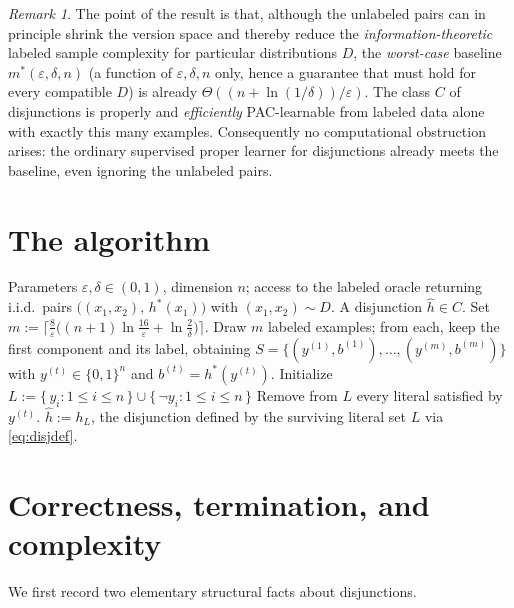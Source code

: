 \documentclass{amsart}
\theoremstyle{definition}
\theoremstyle{remark}
\newtheorem{remark}{Remark}
\newcommand{\eps}{\varepsilon}
\begin{document}
\begin{remark}
The point of the result is that, although the unlabeled pairs can in principle
shrink the version space and thereby reduce the \emph{information-theoretic}
labeled sample complexity for particular distributions $D$, the
\emph{worst-case} baseline $m^*(\eps,\delta,n)$ (a function of $\eps,\delta,n$
only, hence a guarantee that must hold for every compatible $D$) is already
$\Theta((n+\ln(1/\delta))/\eps)$. The class $C$ of disjunctions is properly and
\emph{efficiently} PAC-learnable from labeled data alone with exactly this many
examples. Consequently no computational obstruction arises: the ordinary
supervised proper learner for disjunctions already meets the baseline, even
ignoring the unlabeled pairs.
\end{remark}

\section{The algorithm}

\begin{algorithm}[h]
\caption{Efficient semi-supervised learner for disjunctions}
\label{alg:learn}
\begin{algorithmic}[1]
\Require Parameters $\eps,\delta\in(0,1)$, dimension $n$; access to the labeled
oracle returning i.i.d.\ pairs $\big((x_1,x_2),\,h^*(x_1)\big)$ with
$(x_1,x_2)\sim D$.
\Ensure A disjunction $\hat h\in C$.
\State Set $m:=\big\lceil \tfrac{8}{\eps}\big((n+1)\ln\tfrac{16}{\eps}+\ln\tfrac{2}{\delta}\big)\big\rceil$.
\State Draw $m$ labeled examples; from each, keep the first component and its
label, obtaining $S=\{(y^{(1)},b^{(1)}),\dots,(y^{(m)},b^{(m)})\}$ with
$y^{(t)}\in\{0,1\}^n$ and $b^{(t)}=h^*(y^{(t)})$.
\State Initialize $L:=\{\,y_i : 1\le i\le n\,\}\cup\{\,\lnot y_i : 1\le i\le n\,\}$
    \State Remove from $L$ every literal satisfied by $y^{(t)}$.
  \EndIf
\EndFor
\State \Return $\hat h:=h_L$, the disjunction defined by the surviving literal
set $L$ via \eqref{eq:disjdef}.
\end{algorithmic}
\end{algorithm}

\section{Correctness, termination, and complexity}

We first record two elementary structural facts about disjunctions.
\end{document}
